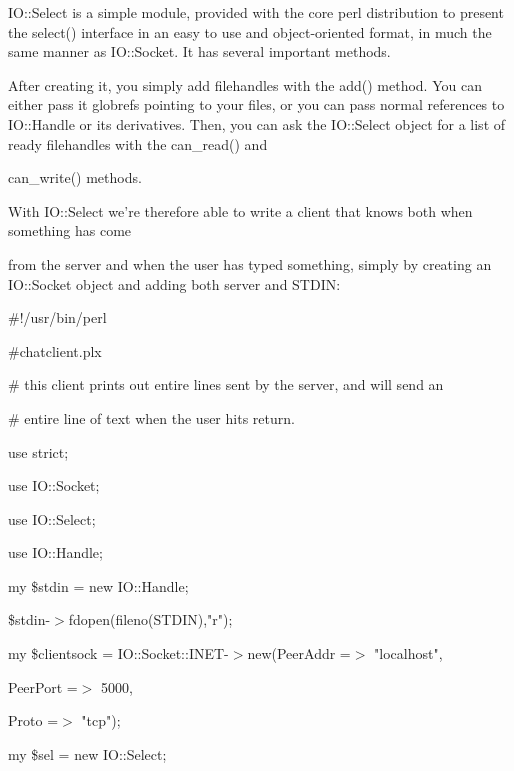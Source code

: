 \documentclass[a4paper,11pt]{book}
\begin{document}
\noindent 

\noindent IO::Select is a simple module, provided with the core perl distribution to present the select() interface in an easy to use and object-oriented format, in much the same manner as IO::Socket. It has several important methods.

\noindent 

\noindent After creating it, you simply add filehandles with the add() method. You can either pass it globrefs pointing to your files, or you can pass normal references to IO::Handle or its derivatives. Then, you can ask the IO::Select object for a list of ready filehandles with the can\_read() and

\noindent can\_write() methods.

\noindent 

\noindent 

\noindent With IO::Select we're therefore able to write a client that knows both when something has come

\noindent from the server and when the user has typed something, simply by creating an IO::Socket object and adding both server and STDIN:

\noindent 

\noindent 

\noindent \#!/usr/bin/perl

\noindent \#chatclient.plx

\noindent \# this client prints out entire lines sent by the server, and will send an

\noindent \# entire line of text when the user hits return.

\noindent 

\noindent use strict;

\noindent use IO::Socket;

\noindent use IO::Select;

\noindent use IO::Handle;

\noindent 

\noindent my \$stdin = new IO::Handle;

\noindent \$stdin-$>$fdopen(fileno(STDIN),"r");

\noindent 

\noindent my \$clientsock = IO::Socket::INET-$>$new(PeerAddr =$>$ "localhost",

\noindent PeerPort =$>$ 5000,

\noindent Proto =$>$ "tcp");

\noindent 

\noindent my \$sel = new IO::Select;
\end{document}
